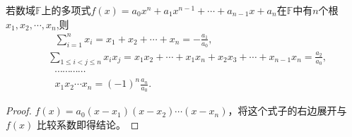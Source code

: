 \documentclass[../../main.tex]{subfiles}
\begin{document}
\begin{theorem}[Vieta定理]\label{theorem:Vieta定理}
若数域\(\mathbb{F}\)上的多项式\(f(x)=a_0x^n + a_1x^{n - 1}+\cdots + a_{n - 1}x + a_n\)在\(\mathbb{F}\)中有\(n\)个根\(x_1,x_2,\cdots,x_n\),则
\begin{align*}
&\,\,\,\, \sum_{i=1}^n{x_i}=x_1+x_2+\cdots +x_n=-\frac{a_1}{a_0},
\\
&\sum_{1\le i<j\le n}{x_ix_j}=x_1x_2+\cdots +x_1x_n+x_2x_3+\cdots +x_{n-1}x_n=\frac{a_2}{a_0},
\\
&\,\,\,\, \cdots \cdots \cdots \cdots 
\\
&\,\,\,\, x_1x_2\cdots x_n=(-1)^n\frac{a_n}{a_0}.
\end{align*}
\end{theorem}
\begin{proof}
$f(x) = a_0 (x - x_1)(x - x_2) \cdots (x - x_n)$，将这个式子的右边展开与 $f(x)$ 比较系数即得结论。
\end{proof}
\end{document}
